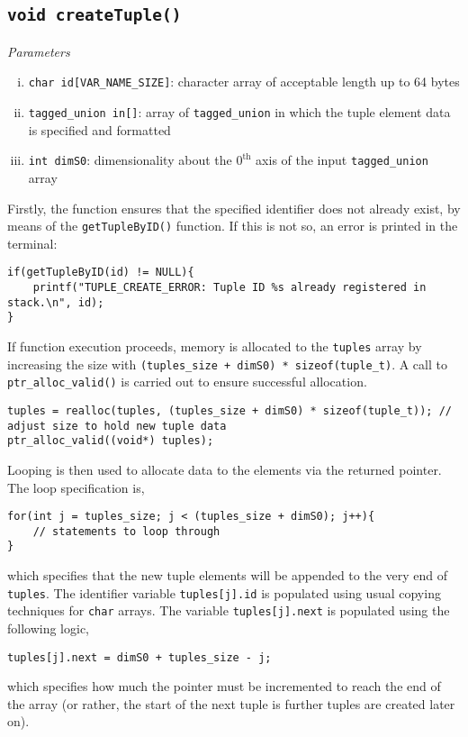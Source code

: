 \documentclass[10pt, a4paper, oneside]{memoir}
\begin{document}
	\subsection{\texttt{void createTuple()}}
	
	\textit{Parameters}
	\begin{enumerate}[i.]
		\item \texttt{char id[VAR_NAME_SIZE]}: character array of acceptable length up to 64 bytes
		\item \texttt{tagged_union in[]}: array of \texttt{tagged_union} in which the tuple element data is specified and formatted
		\item \texttt{int dimS0}: dimensionality about the $0^{\text{th}}$ axis of the input \texttt{tagged_union} array
	\end{enumerate}

	Firstly, the function ensures that the specified identifier does not already exist, by means of the \texttt{getTupleByID()} function. If this is not so, an error is printed in the terminal:
\begin{verbatim}
if(getTupleByID(id) != NULL){
	printf("TUPLE_CREATE_ERROR: Tuple ID %s already registered in stack.\n", id);
}
\end{verbatim}

	If function execution proceeds, memory is allocated to the \texttt{tuples} array by increasing the size with \texttt{(tuples_size + dimS0) * sizeof(tuple_t)}. A call to \texttt{ptr_alloc_valid()} is carried out to ensure successful allocation.
\begin{verbatim}
tuples = realloc(tuples, (tuples_size + dimS0) * sizeof(tuple_t)); // adjust size to hold new tuple data
ptr_alloc_valid((void*) tuples);
\end{verbatim}

	Looping is then used to allocate data to the elements via the returned pointer. The loop specification is,
\begin{verbatim}
for(int j = tuples_size; j < (tuples_size + dimS0); j++){
	// statements to loop through
}
\end{verbatim}
	which specifies that the new tuple elements will be appended to the very end of \texttt{tuples}. The identifier variable \texttt{tuples[j].id} is populated using usual copying techniques for \texttt{char} arrays. The variable \texttt{tuples[j].next} is populated using the following logic,
\begin{verbatim}
tuples[j].next = dimS0 + tuples_size - j;
\end{verbatim}
	which specifies how much the pointer must be incremented to reach the end of the array (or rather, the start of the next tuple is further tuples are created later on).\\
\end{document}
